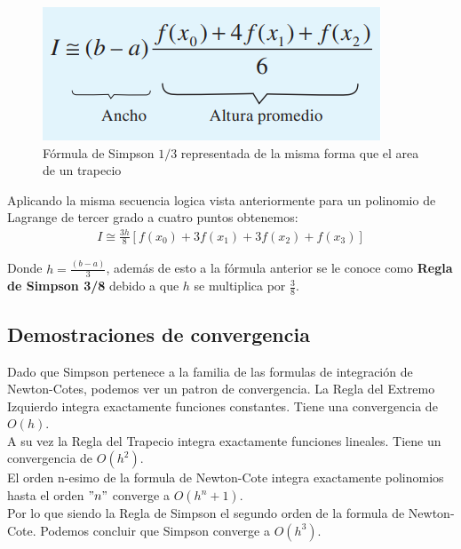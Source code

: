 \documentclass[journal,transmag]{IEEEtran}
\theoremstyle{mytheoremstyle}
\theoremstyle{mytheoremstyle}
\theoremstyle{myproblemstyle}
\begin{document}
        \begin{figure}[H] \label{trapecioSimpson}
            \includegraphics[scale=0.55]{images/trapecio Simpson.png}
            \centering
            \caption{ Fórmula de Simpson $1/3$ representada de la misma forma que el area de un trapecio}
        \end{figure}

        Aplicando la misma secuencia logica vista anteriormente para un polinomio de Lagrange de tercer grado a cuatro puntos obtenemos:
        \begin{equation}
            \begin{split}
                I \cong \frac{3h}{8}[f(x_0) + 3f(x_1) + 3f(x_2) + f(x_3)]
            \end{split}
        \end{equation}

        Donde $h = \frac{(b-a)}{3}$, además de esto a la fórmula anterior se le conoce como \textbf{Regla de Simpson 3/8} debido a que $h$ se multiplica por $\frac{3}{8}$.

    \subsection{Demostraciones de convergencia}
        Dado que Simpson pertenece a la familia de las formulas de integración de Newton-Cotes, podemos ver un patron de convergencia.
        La  Regla del Extremo Izquierdo \cite{openstax_calculusv1} integra exactamente funciones constantes. Tiene una convergencia de $O(h)$. \\
        
        A su vez la Regla del Trapecio integra exactamente funciones lineales. Tiene un convergencia de $O(h^2)$. \\

        El orden n-esimo de la formula de Newton-Cote integra exactamente polinomios hasta el orden $"n"$ converge a $O(h^n+1)$. \\

        Por lo que siendo la Regla de Simpson el segundo orden de la formula de Newton-Cote. Podemos concluir que Simpson converge a $O(h^3)$.
\end{document}
